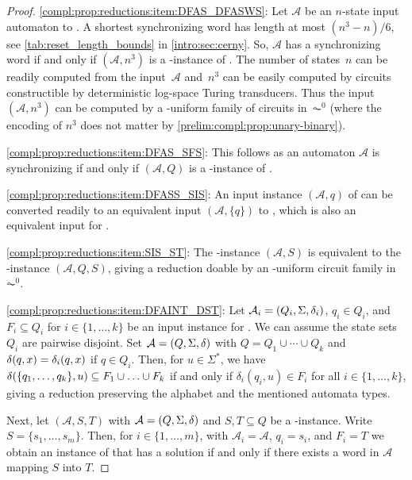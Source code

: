\begin{proof}
	\ref{compl:prop:reductions:item:DFAS_DFASWS}:  Let $\mathcal A$ be an $n$-state input automaton to \DFAS. 
	A shortest synchronizing word has length at most $(n^3 - n) / 6$, see \cref{tab:reset_length_bounds} in \cref{intro:sec:cerny}. 
	So, $\mathcal A$ has a synchronizing word
	if and only if $(\mathcal A, n^3)$ is a \rYES-instance
	of \DFASWS. 
	The number of states~$n$ can be readily computed from the input~$\mathcal A$
	and~$n^3$ can be easily computed by circuits constructible by deterministic log-space Turing transducers. 
	Thus the input $(\mathcal A, n^3)$ can be computed
	by a \LOGSPACE-uniform family of circuits in~$\AC^0$ (where the encoding of $n^3$
	does not matter by \cref{prelim:compl:prop:unary-binary}).
				
	\ref{compl:prop:reductions:item:DFAS_SFS}: This follows as an automaton $\mathcal A$ is synchronizing 
	if and only if $(\mathcal A, Q)$ is a \rYES-instance of \SFS.	
	
	\ref{compl:prop:reductions:item:DFASS_SIS}: An input instance $(\mathcal A, q)$ of \DFASS can be converted
	readily to an equivalent input $(\mathcal A, \{q\})$
	to \SIS, which is also an equivalent input for \REACH.
	
	\ref{compl:prop:reductions:item:SIS_ST}: The \SIS-instance $(\mathcal A, S)$ 
	is equivalent to the \ST-instance $(\mathcal A, Q, S)$, giving a reduction doable by an \LOGSPACE-uniform circuit family in~$\AC^0$.
			
	\ref{compl:prop:reductions:item:DFAINT_DST}: 
	Let $\mathcal A_i = (Q_i, \Sigma, \delta_i)$,
	$q_i \in Q_i$, and $F_i\subseteq Q_i$ for $i \in \{1,\ldots,k\}$
	be an input instance for \DFAINT.
	We can assume the state sets $Q_i$ are pairwise disjoint.
	Set $\mathcal A = (Q, \Sigma, \delta)$ with $Q = Q_1 \cup \cdots \cup Q_k$
	and 
	$
	\delta(q,x) = \delta_i(q,x) 
	$
	if $q \in Q_i$.
	Then, for $u \in \Sigma^*$, we have $\delta(\{ q_1, \ldots, q_k\},u) \subseteq F_1 \cup \ldots \cup F_k$
	if and only if $\delta_i(q_i, u) \in F_i$ for all $i \in \{1,\ldots,k\}$, giving a reduction
	preserving the alphabet and the mentioned automata types.
	
	Next, let $(\mathcal A, S, T)$ with $\mathcal A = (Q, \Sigma, \delta)$
	and $S,T \subseteq Q$ be a \ST-instance. 
	Write $S = \{s_1, \ldots, s_m\}$.
	Then, for $i \in \{1,\ldots,m\}$,
	with $\mathcal A_i = \mathcal A$, $q_i = s_i$,
	and $F_i = T$ we obtain an instance of \DFAINT 
	that has a solution if and only if there exists a word
	in $\mathcal A$ mapping $S$ into $T$.        
		

\end{proof}
